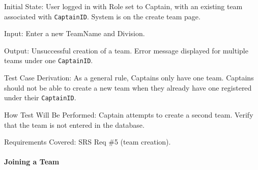 \documentclass[12pt, titlepage]{article}
\begin{document}
\begin{enumerate}
          Initial State: User logged in with Role set to Captain, with an existing team associated with \texttt{CaptainID}. System is on the create team page.

          Input: Enter a new TeamName and Division.

          Output: Unsuccessful creation of a team. Error message displayed for multiple teams under one \texttt{CaptainID}.

          Test Case Derivation: As a general rule, Captains only have one team. Captains should not be able to create a new team when they already have one registered under their \texttt{CaptainID}.

          How Test Will Be Performed: Captain attempts to create a second team. Verify that the team is not entered in the database.

          Requirements Covered: SRS Req \#5 (team creation).
\end{enumerate}

\paragraph{Joining a Team}
\end{document}
